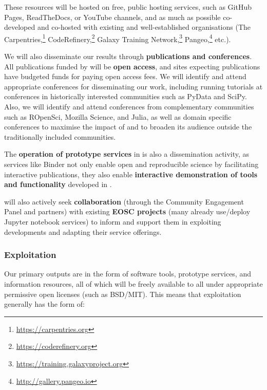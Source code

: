These resources will be hosted on free, public hosting services,
such as GitHub Pages, ReadTheDocs, or YouTube channels, and as much as possible co-developed and co-hosted with existing and
well-established organisations
(The Carpentries,\footnote{\url{https://carpentries.org}} CodeRefinery,\footnote{\url{https://coderefinery.org}}
Galaxy Training Network,\footnote{\url{https://training.galaxyproject.org}} Pangeo,\footnote{\url{http://gallery.pangeo.io}} etc.).

We will also disseminate our results through \textbf{publications and conferences}.
All publications funded by \TheProject will be \textbf{open access},
and sites expecting publications have budgeted funds for paying open access fees.
We will identify and attend appropriate conferences for disseminating our work,
including running tutorials at conferences in historically interested communities such as PyData and SciPy.
Also, we will identify and attend conferences from complementary communities such as ROpenSci,
Mozilla Science, and Julia,
as well as domain specific conferences to maximise the impact of \TheProject and to broaden its
audience outside the
traditionally included communities.

The \textbf{operation of prototype services} in  is also a dissemination activity,
as services like Binder not only enable open and reproducible science by facilitating interactive publications,
they also enable \textbf{interactive demonstration of tools and functionality}
developed in \TheProject.

\TheProject will also actively seek \textbf{collaboration} (through the Community
Engagement Panel and
\TheProject partners) with existing \textbf{EOSC projects} (many already use/deploy
Jupyter notebook services) to inform and support them in exploiting \TheProject
developments and adapting their service offerings.
\subsubsection{Exploitation}

Our primary outputs are in the form of software tools, prototype services, and information resources,
all of which will be freely available to all under appropriate permissive open
licenses (such as BSD/MIT).
This means that exploitation generally has the form of:

